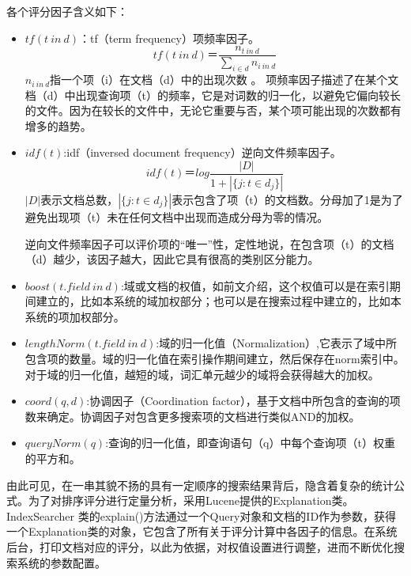 \documentclass[12pt,a4paper]{article}
\begin{document}
	各个评分因子含义如下：
	\begin{itemize}
		\item
	$ tf(t\ in\ d) $：{\Times tf}（{\Times term frequency}）项频率因子。
	\begin{equation}\label{eq:tf}
	tf(t\ in\ d)＝\frac{n_{t\ in\ d}}{\sum_{i \in d}{n_{i\ in\ d}}}
	\end{equation}
	$ {n_{i\ in\ d}} $指一个项（{\Times i}）在文档（{\Times d}）中的出现次数 。	
	项频率因子描述了在某个文档（{\Times d}）中出现查询项（{\Times t}）的频率，它是对词数的归一化，以避免它偏向较长的文件。因为在较长的文件中，无论它重要与否，某个项可能出现的次数都有增多的趋势。
		\item
	$ idf(t) $:{\Times idf}（{\Times inversed document frequency}）逆向文件频率因子。
	\begin{equation}\label{eq:idf}
	idf(t)＝log\frac{|D|}{1+|\{ j:t \in d_j\}|} 
	\end{equation}
	$ |D| $表示文档总数，$ |\{ j:t \in d_j\}| $表示包含了项（{\Times t}）的文档数。分母加了1是为了避免出现项（{\Times t}）未在任何文档中出现而造成分母为零的情况。
	
	逆向文件频率因子可以评价项的“唯一”性，定性地说，在包含项（{\Times t}）的文档（{\Times d}）越少，该因子越大，因此它具有很高的类别区分能力。
		\item
	$ boost(t.field\ in\ d) $:域或文档的权值，如前文介绍，这个权值可以是在索引期间建立的，比如本系统的域加权部分；也可以是在搜索过程中建立的，比如本系统的项加权部分。
		\item
	$ lengthNorm(t.field\ in\ d) $:域的归一化值（{\Times Normalization}）,它表示了域中所包含项的数量。域的归一化值在索引操作期间建立，然后保存在{\Times norm}索引中。对于域的归一化值，越短的域，词汇单元越少的域将会获得越大的加权。
		\item
	$ coord(q,d) $:协调因子（{\Times Coordination factor}），基于文档中所包含的查询的项数来确定。协调因子对包含更多搜索项的文档进行类似{\Times AND}的加权。
		\item
	$ queryNorm(q) $:查询的归一化值，即查询语句（{\Times q}）中每个查询项（{\Times t}）权重的平方和。
	\end{itemize}
	
	由此可见，在一串其貌不扬的具有一定顺序的搜索结果背后，隐含着复杂的统计公式。为了对排序评分进行定量分析，采用{\Times Lucene}提供的{\Times Explanation}类。{\Times IndexSearcher} 类的{\Times explain(})方法通过一个{\Times Query}对象和文档的{\Times ID}作为参数，获得一个{\Times Explanation}类的对象，它包含了所有关于评分计算中各因子的信息。在系统后台，打印文档对应的评分，以此为依据，对权值设置进行调整，进而不断优化搜索系统的参数配置。	
	
\end{document}
